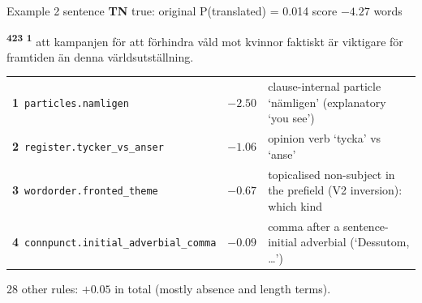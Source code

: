 \begin{exbox}[unbreakable]{Example 2 \quad sentence \quad \textbf{TN} \quad true: original \quad P(translated) = 0.014 \quad score $-4.27$  words}
{\setlength{\parindent}{0pt}\raggedright {}\textsuperscript{\sffamily\bfseries 4}\highLight[tsO!35]{ }\textsuperscript{\sffamily\bfseries 2}\textsuperscript{\sffamily\bfseries 3} \textsuperscript{\sffamily\bfseries 1} att kampanjen för att förhindra våld mot kvinnor faktiskt är viktigare för framtiden än denna världsutställning.}\par{}
\par\medskip
{\footnotesize
\begin{tabularx}{\linewidth}{@{}l r X@{}}
\textbf{1}~\texttt{particles.namligen} & $-2.50$ & clause-internal particle `nämligen' (explanatory `you see') \\
\textbf{2}~\texttt{register.tycker\_vs\_anser} & $-1.06$ & opinion verb `tycka' vs `anse' \\
\textbf{3}~\texttt{wordorder.fronted\_theme} & $-0.67$ & topicalised non-subject in the prefield (V2 inversion): which kind \\
\textbf{4}~\texttt{connpunct.initial\_adverbial\_comma} & $-0.09$ & comma after a sentence-initial adverbial (`Dessutom, \ldots{}') \\
\end{tabularx}
\par 28 other rules: $+0.05$ in total (mostly absence and length terms).}
\par{}
\end{exbox}


